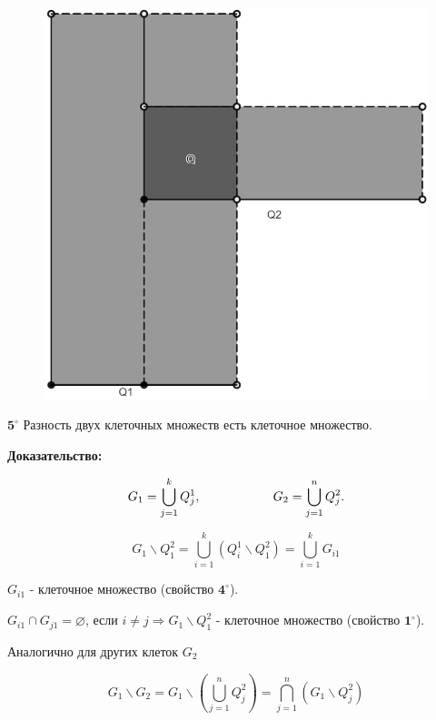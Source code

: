 \documentclass[a4paper,12pt]{article} %
\begin{document}
\begin{figure}[h!]
	\centering
	\includegraphics[scale=0.1]{Q.jpg}
\end{figure} 



$\textbf{5}^\circ$ Разность двух клеточных множеств есть клеточное множество.

\textbf{Доказательство:}

\begin{equation*}
	G_1 = \bigcup_{j = 1}^k Q_j^1, \hspace{20mm} G_2 = \bigcup_{j = 1}^n Q_j^2.
\end{equation*}


\begin{equation*}
	G_1 \backslash Q_1^2 = \bigcup_{i = 1}^k \left(Q_i^1 \backslash Q_1^2\right) = \bigcup_{i = 1}^k G_{i1} 
\end{equation*}


$G_{i1}$ - клеточное множество (свойство $\textbf{4}^\circ$).

$G_{i1} \cap G_{j1} = \varnothing$, если $i \neq j \Rightarrow G_1 \backslash Q_1^2$ - клеточное множество (свойство $\textbf{1}^\circ$). 

Аналогично для других клеток $G_2$

\begin{equation*}
	G_1 \backslash G_2 = G_1 \backslash \left( \bigcup_{j = 1}^n Q_j^2\right) = \bigcap_{j = 1}^n\left(G_1 \backslash Q_j^2\right)
\end{equation*}
\end{document}
